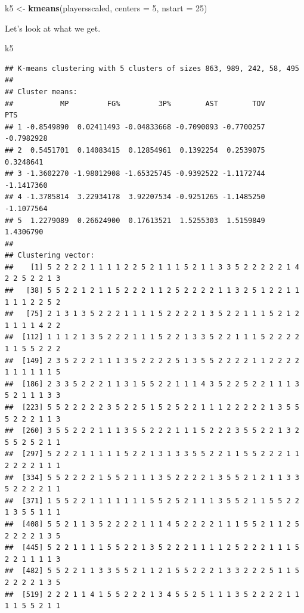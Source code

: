 \documentclass[]{book}
\newenvironment{Shaded}{\begin{snugshade}}{\end{snugshade}}
\newcommand{\DataTypeTok}[1]{\textcolor[rgb]{0.13,0.29,0.53}{#1}}
\newcommand{\DecValTok}[1]{\textcolor[rgb]{0.00,0.00,0.81}{#1}}
\newcommand{\KeywordTok}[1]{\textcolor[rgb]{0.13,0.29,0.53}{\textbf{#1}}}
\newcommand{\NormalTok}[1]{#1}
\newcommand{\StringTok}[1]{\textcolor[rgb]{0.31,0.60,0.02}{#1}}
\begin{document}
\begin{Shaded}
\begin{Highlighting}[]
\NormalTok{k5 <-}\StringTok{ }\KeywordTok{kmeans}\NormalTok{(playersscaled, }\DataTypeTok{centers =} \DecValTok{5}\NormalTok{, }\DataTypeTok{nstart =} \DecValTok{25}\NormalTok{)}
\end{Highlighting}
\end{Shaded}

Let's look at what we get.

\begin{Shaded}
\begin{Highlighting}[]
\NormalTok{k5}
\end{Highlighting}
\end{Shaded}

\begin{verbatim}
## K-means clustering with 5 clusters of sizes 863, 989, 242, 58, 495
## 
## Cluster means:
##           MP         FG%         3P%        AST        TOV        PTS
## 1 -0.8549890  0.02411493 -0.04833668 -0.7090093 -0.7700257 -0.7982928
## 2  0.5451701  0.14083415  0.12854961  0.1392254  0.2539075  0.3248641
## 3 -1.3602270 -1.98012908 -1.65325745 -0.9392522 -1.1172744 -1.1417360
## 4 -1.3785814  3.22934178  3.92207534 -0.9251265 -1.1485250 -1.1077564
## 5  1.2279089  0.26624900  0.17613521  1.5255303  1.5159849  1.4306790
## 
## Clustering vector:
##    [1] 5 2 2 2 2 1 1 1 1 2 2 5 2 1 1 1 5 2 1 1 3 3 5 2 2 2 2 2 1 4 2 2 5 2 2 1 3
##   [38] 5 5 2 2 1 2 1 1 5 2 2 2 1 1 2 5 2 2 2 2 1 1 3 2 5 1 2 2 1 1 1 1 1 2 2 5 2
##   [75] 2 1 3 1 3 5 2 2 2 1 1 1 1 5 2 2 2 2 1 3 5 2 2 1 1 1 5 2 1 2 1 1 1 1 4 2 2
##  [112] 1 1 1 2 1 3 5 2 2 2 1 1 1 5 2 2 1 3 3 5 2 2 1 1 1 5 2 2 2 2 1 1 5 5 2 2 2
##  [149] 2 3 5 2 2 2 1 1 1 3 5 2 2 2 2 5 1 3 5 5 2 2 2 2 1 1 2 2 2 2 1 1 1 1 1 1 5
##  [186] 2 3 3 5 2 2 2 1 1 3 1 5 5 2 2 1 1 1 4 3 5 2 2 5 2 2 1 1 1 3 5 2 1 1 1 3 3
##  [223] 5 5 2 2 2 2 2 3 5 2 2 5 1 5 2 5 2 2 1 1 1 2 2 2 2 2 1 3 5 5 5 2 2 2 1 1 3
##  [260] 3 5 5 2 2 2 1 1 1 3 5 5 2 2 2 1 1 1 5 2 2 2 3 5 5 2 2 1 3 2 5 5 2 5 2 1 1
##  [297] 5 2 2 2 1 1 1 1 1 5 2 2 1 3 1 3 3 5 5 2 2 1 1 5 5 2 2 2 1 1 2 2 2 2 1 1 1
##  [334] 5 5 2 2 2 2 1 5 5 2 1 1 1 3 5 2 2 2 2 1 3 5 5 2 1 2 1 1 3 3 5 2 2 2 2 1 1
##  [371] 1 5 5 2 2 1 1 1 1 1 1 1 5 5 2 5 2 1 1 1 3 5 5 2 1 1 5 5 2 2 1 3 5 5 1 1 1
##  [408] 5 5 2 1 1 3 5 2 2 2 2 1 1 1 4 5 2 2 2 2 1 1 1 5 5 2 1 1 2 5 2 2 2 2 1 3 5
##  [445] 5 2 2 1 1 1 1 5 5 2 2 1 3 5 2 2 2 1 1 1 1 2 5 2 2 2 1 1 1 5 2 2 1 1 1 1 3
##  [482] 5 5 2 2 1 1 3 3 5 5 2 1 1 2 1 5 5 2 2 2 1 3 3 2 2 2 5 1 1 5 2 2 2 2 1 3 5
##  [519] 2 2 2 1 1 4 1 5 5 2 2 2 1 3 4 5 5 2 5 1 1 1 3 5 2 2 2 2 1 1 1 1 5 5 2 1 1

\end{verbatim}
\end{document}
